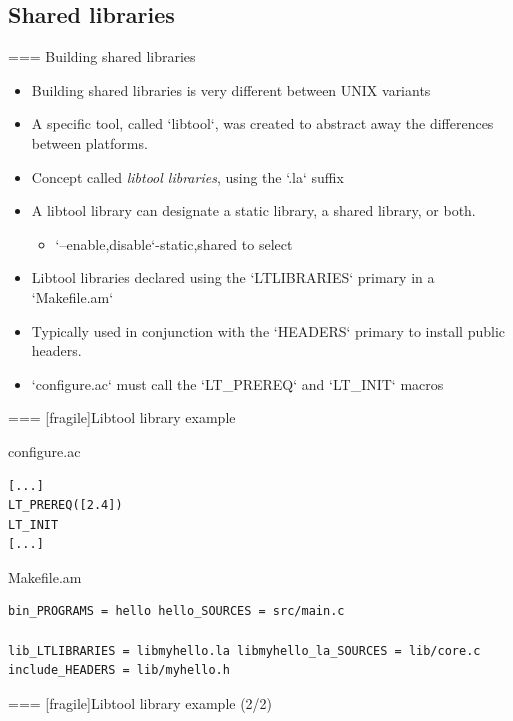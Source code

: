 \subsection{Shared libraries}

=== {Building shared libraries}
  \begin{itemize}
  \item Building shared libraries is very different between UNIX
    variants
  \item A specific tool, called `libtool`, was created to
    abstract away the differences between platforms.
  \item Concept called {\em libtool libraries}, using the `.la`
    suffix
  \item A libtool library can designate a static library, a shared
    library, or both.
    \begin{itemize}
    \item `--{enable,disable`-{static,shared}} to select
    \end{itemize}
  \item Libtool libraries declared using the `LTLIBRARIES`
    primary in a `Makefile.am`
  \item Typically used in conjunction with the `HEADERS` primary
    to install public headers.
  \item `configure.ac` must call the `LT_PREREQ` and
    `LT_INIT` macros
  \end{itemize}


=== [fragile]{Libtool library example}

\begin{block}{configure.ac}
\begin{verbatim}
[...]
LT_PREREQ([2.4])
LT_INIT
[...]
\end{verbatim}
\end{block}

\begin{block}{Makefile.am}
\begin{verbatim}
bin_PROGRAMS = hello hello_SOURCES = src/main.c

lib_LTLIBRARIES = libmyhello.la libmyhello_la_SOURCES = lib/core.c include_HEADERS = lib/myhello.h
\end{verbatim}
\end{block}



=== [fragile]{Libtool library example (2/2)}

